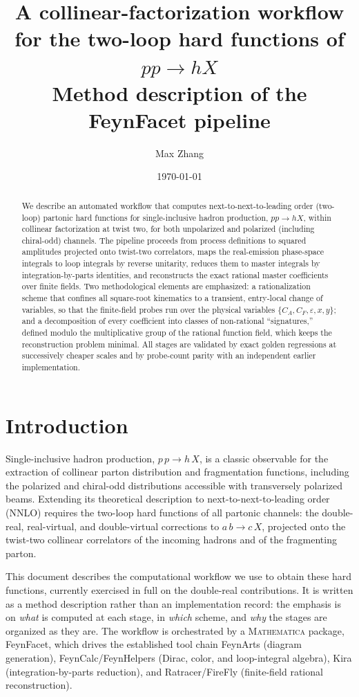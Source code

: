 \documentclass[11pt]{article}
\title{A collinear-factorization workflow for the two-loop hard
functions of $pp \to h X$\\[1ex]
\large Method description of the \textsf{FeynFacet} pipeline}
\author{Max Zhang}
\date{\today}
\newcommand{\eps}{\varepsilon}
\newcommand{\CA}{C_A}
\newcommand{\CF}{C_F}
\begin{document}
\maketitle

\begin{abstract}
We describe an automated workflow that computes next-to-next-to-leading
order (two-loop) partonic hard functions for single-inclusive hadron
production, $pp \to h X$, within collinear factorization at twist two,
for both unpolarized and polarized (including chiral-odd) channels.
The pipeline proceeds from process definitions to squared amplitudes
projected onto twist-two correlators, maps the real-emission phase-space
integrals to loop integrals by reverse unitarity, reduces them to master
integrals by integration-by-parts identities, and reconstructs the exact
rational master coefficients over finite fields.  Two methodological
elements are emphasized: a rationalization scheme that confines all
square-root kinematics to a transient, entry-local change of variables,
so that the finite-field probes run over the physical variables
$\{\CA,\CF,\eps,x,y\}$; and a decomposition of every coefficient into
classes of non-rational ``signatures,'' defined modulo the
multiplicative group of the rational function field, which keeps the
reconstruction problem minimal.  All stages are validated by exact
golden regressions at successively cheaper scales and by probe-count
parity with an independent earlier implementation.
\end{abstract}

\section{Introduction}

Single-inclusive hadron production, $p\,p \to h\,X$, is a classic
observable for the extraction of collinear parton distribution and
fragmentation functions, including the polarized and chiral-odd
distributions accessible with transversely polarized beams.  Extending
its theoretical description to next-to-next-to-leading order (NNLO)
requires the two-loop hard functions of all partonic channels: the
double-real, real-virtual, and double-virtual corrections to
$a\,b \to c\,X$, projected onto the twist-two collinear correlators of
the incoming hadrons and of the fragmenting parton.

This document describes the computational workflow we use to obtain
these hard functions, currently exercised in full on the double-real
contributions.  It is written as a method description rather than an
implementation record: the emphasis is on \emph{what} is computed at
each stage, in \emph{which} scheme, and \emph{why} the stages are
organized as they are.  The workflow is orchestrated by a
\textsc{Mathematica} package, \textsf{FeynFacet}, which drives the
established tool chain \textsf{FeynArts} (diagram generation),
\textsf{FeynCalc}/\textsf{FeynHelpers} (Dirac, color, and loop-integral
algebra), \textsf{Kira} (integration-by-parts reduction), and
\textsf{Ratracer}/\textsf{FireFly} (finite-field rational
reconstruction).
\end{document}
